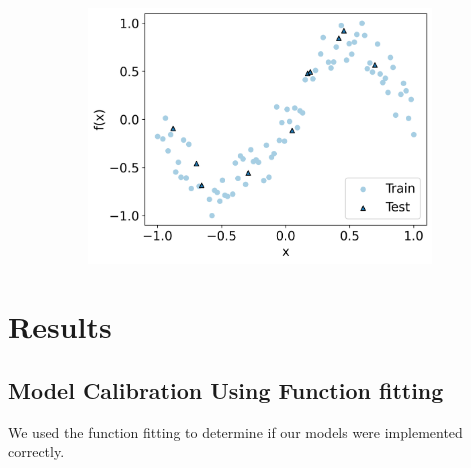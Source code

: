 \documentclass[journal=jacsat,manuscript=article]{achemso}
\begin{document}
\begin{figure}[H]
\begin{subfigure}[b]{0.3\textwidth}
		\centering
		\includegraphics[width=\textwidth]{images/Function_Fitting/function_dataset/sine_train_vs_test.png}
		\caption{}
		\label{fig:sine_train_vs_test}
	\end{subfigure}
	\caption{}
	\label{fig:train_vs_test}
\end{figure}

\section{Results}
\subsection{Model Calibration Using Function fitting} 
We used the function fitting to determine if our models were implemented correctly.
\end{document}
